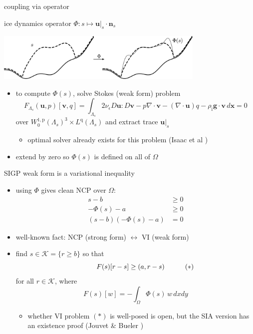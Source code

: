 \documentclass{beamer}
\newcommand{\eps}{\epsilon}
\newcommand{\Div}{\nabla\cdot}
\newcommand{\bg}{\mathbf{g}}
\newcommand{\bn}{\mathbf{n}}
\newcommand{\bu}{\mathbf{u}}
\newcommand{\bv}{\mathbf{v}}
\newcommand{\bx}{\mathbf{x}}
\newcommand{\rhoi}{\rho_{\text{i}}}
\newcommand{\ip}[2]{\left(#1,#2\right)}
\newcommand{\pp}{{\text{p}}}
\newcommand{\qq}{{\text{q}}}
\newcommand{\bus}{\bu|_s}
\begin{document}
\begin{frame}{coupling via operator}

\begin{block}{ice dynamics operator}
$\Phi : s \mapsto \bus \cdot \bn_s$

\vspace{-3mm}

\hfill \includegraphics[width=0.75\textwidth]{figs/idoaction.png}
\end{block}

\begin{itemize}
\item to compute $\Phi(s)$, solve Stokes (weak form) problem
    $$F_{\Lambda_s}(\bu,p)[\bv,q] = \int_{\Lambda_s} 2 \nu_\eps D\bu : D\bv - p \Div\bv - (\Div\bu) q - \rhoi \bg \cdot \bv\,d\bx = 0$$
over $W_0^{1,\pp}(\Lambda_s)^3 \times L^\qq(\Lambda_s)$ and extract trace $\bus$

\medskip
    \begin{itemize}
    \item optimal solver already exists for this problem (Isaac et al \cite{IsaacStadlerGhattas2015})
    \end{itemize}
\item extend by zero so $\Phi(s)$ is defined on all of $\Omega$
\end{itemize}

\end{frame}


\begin{frame}{SIGP weak form is a variational inequality}

\begin{itemize}
\item using $\Phi$ gives clean NCP over $\Omega$:
\begin{align*}
s - b &\ge 0 \\
- \Phi(s) - a &\ge 0 \\
(s - b) (- \Phi(s) - a) &= 0
\end{align*}

\item well-known fact: \quad  NCP (strong form) $\leftrightarrow$ VI (weak form)
\item find $s \in \mathcal{K} = \{r \ge b\}$ so that
    $$\hspace{10mm} F(s)[r - s] \ge \ip{a}{r-s} \hspace{10mm} (\ast)$$
for all $r \in \mathcal{K}$, where
    $$F(s)[w] = - \int_\Omega \Phi(s)\, w \,dx dy$$
    \begin{itemize}
    \item whether VI problem $(\ast)$ is well-posed is open, but the SIA version has an existence proof (Jouvet \& Bueler \cite{JouvetBueler2012})
    \end{itemize}
\end{itemize}

\end{frame}
\end{document}
